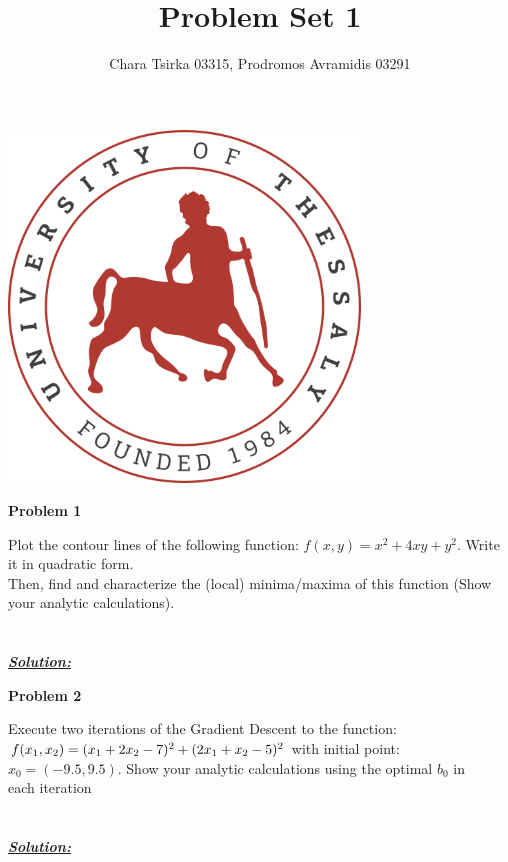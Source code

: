 \documentclass{article}
\title{Problem Set 1}
\author{Chara Tsirka 03315, Prodromos Avramidis 03291}
\begin{document}
\maketitle
\begin{center}
\vspace{5cm}
\includegraphics[width=0.7\textwidth]{uthlogo.png}
\end{center}
\newpage
\noindent \textbf{Problem 1}

\noindent Plot the contour lines of the following function: $f(x,y) = x^2+4xy+y^2$. Write it in quadratic form.\\ Then, find and characterize the (local) minima/maxima of this function (Show your analytic calculations).
\\ \\ \\

\noindent \underline{\textbf{\textit{Solution:}}}




\newpage
\noindent \textbf{Problem 2}

\noindent Execute two iterations of the Gradient Descent to the function: $f(x_1,x_2) = (x_1+2x_2-7)^2 + (2x_1+ \\ x_2-5)^2$ with initial point: $x_0 = (-9.5,9.5)$. Show your analytic calculations
 using the optimal $b_0$ in \\ each iteration\\ \\ \\
\underline{\textbf{\textit{Solution:}}}
\end{document}
